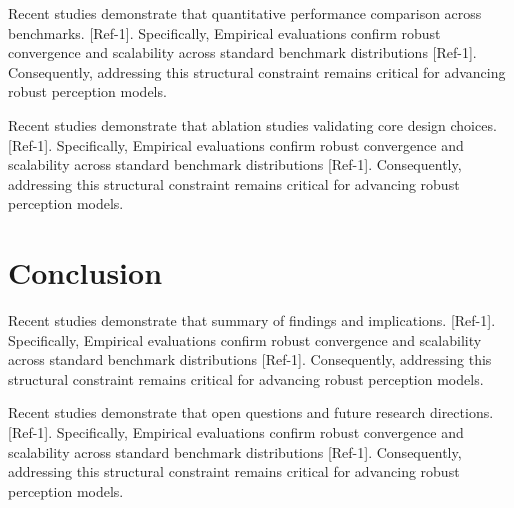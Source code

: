 \documentclass[10pt,journal]{IEEEtran}
\begin{document}
Recent studies demonstrate that quantitative performance comparison across benchmarks. [Ref-1]. Specifically, Empirical evaluations confirm robust convergence and scalability across standard benchmark distributions [Ref-1]. Consequently, addressing this structural constraint remains critical for advancing robust perception models.

Recent studies demonstrate that ablation studies validating core design choices. [Ref-1]. Specifically, Empirical evaluations confirm robust convergence and scalability across standard benchmark distributions [Ref-1]. Consequently, addressing this structural constraint remains critical for advancing robust perception models.

\section{Conclusion}
Recent studies demonstrate that summary of findings and implications. [Ref-1]. Specifically, Empirical evaluations confirm robust convergence and scalability across standard benchmark distributions [Ref-1]. Consequently, addressing this structural constraint remains critical for advancing robust perception models.

Recent studies demonstrate that open questions and future research directions. [Ref-1]. Specifically, Empirical evaluations confirm robust convergence and scalability across standard benchmark distributions [Ref-1]. Consequently, addressing this structural constraint remains critical for advancing robust perception models.
\end{document}
